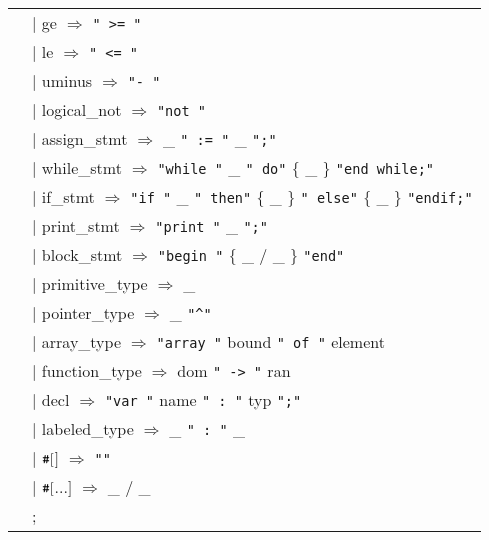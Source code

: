 {\begin{tabular}{l}
\ \ $|$ ge             $\Rightarrow$ \verb." >= ".\\
\ \ $|$ le             $\Rightarrow$ \verb." <= ".\\
\ \ $|$ uminus         $\Rightarrow$ \verb."- ".\\
\ \ $|$ logical\_not    $\Rightarrow$ \verb."not ".\\
\ \ $|$ assign\_stmt    $\Rightarrow$ \_ \verb." := ". \_ \verb.";".\\
\ \ $|$ while\_stmt     $\Rightarrow$ \verb."while ". \_ \verb." do". $\{$ \_ $\}$ \verb."end while;".\\
\ \ $|$ if\_stmt        $\Rightarrow$ \verb."if ". \_ \verb." then". $\{$ \_ $\}$ \verb." else". $\{$ \_ $\}$ \verb."endif;".\\
\ \ $|$ print\_stmt     $\Rightarrow$ \verb."print ". \_ \verb.";". \\
\ \ $|$ block\_stmt     $\Rightarrow$ \verb."begin ". $\{$ \_ $/$ \_ $\}$ \verb."end".\\
\ \ $|$ primitive\_type $\Rightarrow$ \_\\
\ \ $|$ pointer\_type   $\Rightarrow$ \_ \verb."^".\\
\ \ $|$ array\_type     $\Rightarrow$ \verb."array ". bound \verb." of ". element \\
\ \ $|$ function\_type  $\Rightarrow$ dom \verb." -> ". ran\\
\ \ $|$ decl           $\Rightarrow$ \verb."var ". name \verb." : ". typ \verb.";".\\
\ \ $|$ labeled\_type   $\Rightarrow$ \_ \verb." : ". \_\\
\ \ $|$ $\verb.#.[$$]$            $\Rightarrow$ \verb."".\\
\ \ $|$ $\verb.#.[$$.$$.$$.$$]$         $\Rightarrow$ \_ $/$ \_\\
\ \ $;$\\
\end{tabular}}

